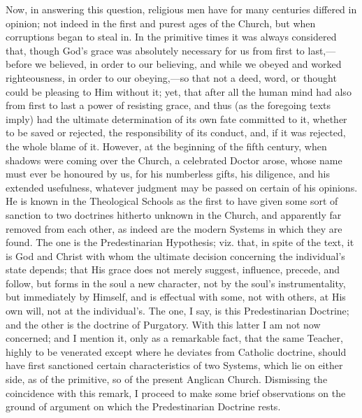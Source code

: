 Now, in answering this question, religious men have for many
centuries differed in opinion; not indeed in the first and purest ages
of the Church, but when corruptions began to steal in. In the primitive
times it was always considered that, though God's grace was absolutely
necessary for us from first to last,—before we believed, in order to
our believing, and while we obeyed and worked righteousness, in order to
our obeying,—so that not a deed, word, or thought could be pleasing to
Him without it; yet, that after all the human mind had also from first
to last a power of resisting grace, and thus (as the foregoing texts
imply) had the ultimate determination of its own fate committed to it,
whether to be saved or rejected, the responsibility of its conduct, and,
if it was rejected, the whole blame of it. However, at the beginning of
the fifth century, when shadows were coming over the Church, a
celebrated Doctor arose, whose name must ever be honoured by us, for his
numberless gifts, his diligence, and his extended usefulness, whatever
judgment may be passed on certain of his opinions. He is known in the
Theological Schools as the first to have given some sort of sanction to
two doctrines hitherto unknown in the Church, and apparently far removed
from each other, as indeed are the modern Systems in which they are
found. The one is the Predestinarian Hypothesis; viz. that, in spite of
the text, it is God and Christ with whom the ultimate decision
concerning the individual's state depends; that His grace does not
merely suggest, influence, precede, and follow, but forms in the soul a
new character, not by the soul's instrumentality, but immediately by
Himself, and is effectual with some, not with others, at His own will,
not at the individual's. The one, I say, is this Predestinarian
Doctrine; and the other is the doctrine of Purgatory. With this latter I
am not now concerned; and I mention it, only as a remarkable fact, that
the same Teacher, highly to be venerated except where he deviates from
Catholic doctrine, should have first sanctioned certain characteristics
of two Systems, which lie on either side, as of the primitive, so of the
present Anglican Church. Dismissing the coincidence with this remark, I
proceed to make some brief observations on the ground of argument on
which the Predestinarian Doctrine rests.

